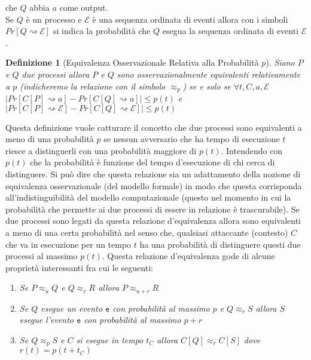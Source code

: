 \documentclass[a4paper,openright,twoside,12pt]{report}
\newtheorem{definizione}{Definizione}[chapter]
\begin{document}
che $Q$ abbia $a$ come output. \\
Se $Q$ \`e un processo e $\mathcal{E}$ \`e una sequenza ordinata di eventi allora con i simboli $Pr[Q \rightsquigarrow \mathcal{E}]$ si indica la probabilit\`a che $Q$ esegua la sequenza ordinata di eventi $\mathcal{E}$ . 
\begin{definizione}[Equivalenza Osservazionale Relativa alla Probabilit\`a $p$]
Siano $P$ e $Q$ due processi allora $P$ e $Q$ sono osservazionalmente equivalenti relativamente a $p$ (indicheremo la relazione con il simbolo $\approx_p$) se e solo se $\forall t, C, a, \mathcal{E}$
$\lvert Pr[C[P] \rightsquigarrow a] - Pr[C[Q]\rightsquigarrow a] \rvert \leq p(t)$ e $\lvert Pr[C[P] \rightsquigarrow \mathcal{E}] -  Pr[C[Q] \rightsquigarrow \mathcal{E}]\rvert \leq p(t)$ 
\end{definizione}
Questa definizione vuole catturare il concetto che due processi sono equivalenti a meno di una probabilit\`a $p$ se nessun avversario che ha tempo di esecuzione $t$ riesce
a distinguerli con una probabilit\`a maggiore di $p(t)$. Intendendo con $p(t)$ che la probabilit\`a \`e funzione del tempo d'esecuzione di chi cerca di distinguere. 
Si pu\`o dire che questa relazione sia un adattamento della nozione di equivalenza osservazionale (del modello formale) in modo che questa corrisponda all'indistinguibilit\`a 
del modello computazionale 
(questo nel momento in cui la probabilit\`a che permette ai due processi di essere in relazione \`e trascurabile). Se due processi sono legati da questa relazione d'equivalenza 
allora sono equivalenti a meno di una certa probabilit\`a nel senso che, 
qualsiasi attaccante (contesto) $C$ che va in esecuzione per un tempo $t$ ha una probabilit\`a di distinguere questi due processi al massimo $p(t)$.
Questa relazione d'equivalenza gode di alcune propriet\`a interessanti fra cui le seguenti:
\begin{enumerate}
 \item \emph{Se $P \approx_u Q$ e $Q \approx_{r} R$ allora $P \approx_{u+r} R$}
 \item \emph{Se $Q$ esegue un evento $\texttt{e}$ con probabilit\`a al massimo $p$ e $Q \approx_r S$ allora $S$ esegue l'evento $\texttt{e}$ con probabilit\`a al massimo $p+r$}
 \item \emph{Se $Q \approx_p S$ e $C$ si esegue in tempo $t_C$ allora $C[Q] \approx_{r} C[S]$ dove $r(t)=p(t+t_C)$}
\end{enumerate}
\end{document}
